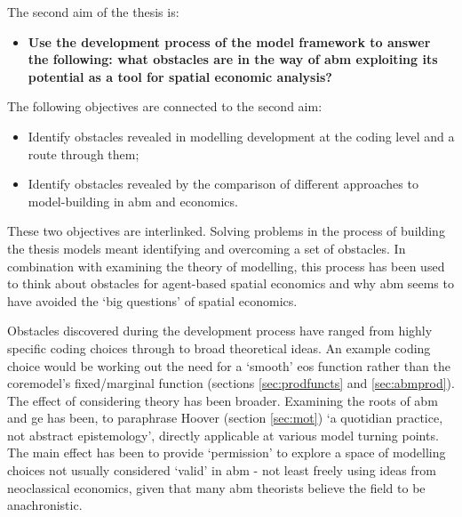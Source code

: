 The second aim of the thesis is:

\begin{itemize}
\item \textbf{Use the development process of the model framework to answer the following: what obstacles are in the way of \gls{abm} exploiting its potential as a tool for spatial economic analysis?}
\end{itemize}

The following objectives are connected to the second aim:

\begin{itemize}
	\item Identify obstacles revealed in modelling development at the coding level and a route through them;
	\item Identify obstacles revealed by the comparison of different approaches to model-building in \gls{abm} and economics.
\end{itemize}

These two objectives are interlinked. Solving problems in the process of building the thesis models meant identifying and overcoming a set of obstacles. In combination with examining the theory of modelling, this process has been used to think about obstacles for agent-based spatial economics and why \gls{abm} seems to have avoided the `big questions' of spatial economics.

Obstacles discovered during the development process have ranged from highly specific coding choices through to broad theoretical ideas. An example coding choice would be working out the need for a `smooth' \gls{eos} function rather than the \gls{coremodel}'s fixed/marginal function (sections \ref{sec:prodfuncts} and \ref{sec:abmprod}). The effect of considering theory has been broader. Examining the roots of \gls{abm} and \gls{ge} has been, to paraphrase Hoover (section \ref{sec:mot}) `a quotidian practice, not abstract epistemology', directly applicable at various model turning points. The main effect has been to provide  `permission' to explore a space of modelling choices not usually considered `valid' in \gls{abm} - not least freely using ideas from neoclassical economics, given that many \gls{abm} theorists believe the field to be anachronistic.

